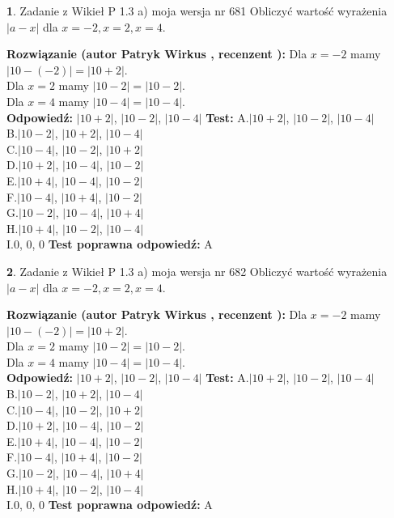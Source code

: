 \documentclass[12pt, a4paper]{article}
\theoremstyle{definition} %
\newtheorem{zad}{}
\newcommand{\zadStart}[1]{\begin{zad}#1\newline}
\newcommand{\zadStop}{\end{zad}}
\newcommand{\rozwStart}[2]{\noindent \textbf{Rozwiązanie (autor #1 , recenzent #2): }\newline}
\newcommand{\rozwStop}{\newline}
\newcommand{\odpStart}{\noindent \textbf{Odpowiedź:}\newline}
\newcommand{\odpStop}{\newline}
\newcommand{\testStart}{\noindent \textbf{Test:}\newline}
\newcommand{\testStop}{\newline}
\newcommand{\kluczStart}{\noindent \textbf{Test poprawna odpowiedź:}\newline}
\newcommand{\kluczStop}{\newline}
\begin{document}
\zadStart{Zadanie z Wikieł P 1.3 a) moja wersja nr 681}
Obliczyć wartość wyrażenia $|a - x|$ dla $x=-2,x=2,x=4$.
\zadStop
\rozwStart{Patryk Wirkus}{}
Dla $x = -2$ mamy $|10 - (-2)| = |10 + 2|$.\\
Dla $x = 2$ mamy $|10 - 2| = |10 - 2|$.\\
Dla $x = 4$ mamy $|10 - 4| = |10 - 4|$.\\
\rozwStop
\odpStart
$|10 + 2|$, $|10 - 2|$, $|10 - 4|$
\odpStop
\testStart
A.$|10 + 2|$, $|10 - 2|$, $|10 - 4|$\\
B.$|10 - 2|$, $|10 + 2|$, $|10 - 4|$\\
C.$|10 - 4|$, $|10 - 2|$, $|10 + 2|$\\
D.$|10 + 2|$, $|10 - 4|$, $|10 - 2|$\\
E.$|10 + 4|$, $|10 - 4|$, $|10 - 2|$\\
F.$|10 - 4|$, $|10 + 4|$, $|10 - 2|$\\
G.$|10 - 2|$, $|10 - 4|$, $|10 + 4|$\\
H.$|10 + 4|$, $|10 - 2|$, $|10 - 4|$\\
I.$0$, $0$, $0$
\testStop
\kluczStart
A
\kluczStop



\zadStart{Zadanie z Wikieł P 1.3 a) moja wersja nr 682}
Obliczyć wartość wyrażenia $|a - x|$ dla $x=-2,x=2,x=4$.
\zadStop
\rozwStart{Patryk Wirkus}{}
Dla $x = -2$ mamy $|10 - (-2)| = |10 + 2|$.\\
Dla $x = 2$ mamy $|10 - 2| = |10 - 2|$.\\
Dla $x = 4$ mamy $|10 - 4| = |10 - 4|$.\\
\rozwStop
\odpStart
$|10 + 2|$, $|10 - 2|$, $|10 - 4|$
\odpStop
\testStart
A.$|10 + 2|$, $|10 - 2|$, $|10 - 4|$\\
B.$|10 - 2|$, $|10 + 2|$, $|10 - 4|$\\
C.$|10 - 4|$, $|10 - 2|$, $|10 + 2|$\\
D.$|10 + 2|$, $|10 - 4|$, $|10 - 2|$\\
E.$|10 + 4|$, $|10 - 4|$, $|10 - 2|$\\
F.$|10 - 4|$, $|10 + 4|$, $|10 - 2|$\\
G.$|10 - 2|$, $|10 - 4|$, $|10 + 4|$\\
H.$|10 + 4|$, $|10 - 2|$, $|10 - 4|$\\
I.$0$, $0$, $0$
\testStop
\kluczStart
A
\kluczStop
\end{document}

